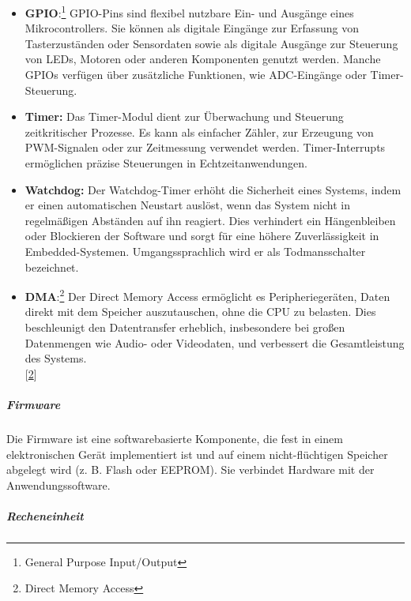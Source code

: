 \documentclass[
    headings=optiontotocandhead,%
    twoside,
    numbers=noenddot,%
    12pt, %
    titlepage, %
    parskip=full, %
    listof=leveldown, 
    numbers=noenddot, %
    a4paper,DIV=14,
    BCOR=15mm,
]{scrbook}
\begin{document}
\begin{itemize}
\item
  \textbf{GPIO}:\footnote{General Purpose Input/Output} GPIO-Pins sind
  flexibel nutzbare Ein- und Ausgänge eines Mikrocontrollers. Sie können
  als digitale Eingänge zur Erfassung von Tasterzuständen oder
  Sensordaten sowie als digitale Ausgänge zur Steuerung von LEDs,
  Motoren oder anderen Komponenten genutzt werden. Manche GPIOs verfügen
  über zusätzliche Funktionen, wie ADC-Eingänge oder Timer-Steuerung.
\item
  \textbf{Timer:} Das Timer-Modul dient zur Überwachung und Steuerung
  zeitkritischer Prozesse. Es kann als einfacher Zähler, zur Erzeugung
  von PWM-Signalen oder zur Zeitmessung verwendet werden.
  Timer-Interrupts ermöglichen präzise Steuerungen in
  Echtzeitanwendungen.
\item
  \textbf{Watchdog:} Der Watchdog-Timer erhöht die Sicherheit eines
  Systems, indem er einen automatischen Neustart auslöst, wenn das
  System nicht in regelmäßigen Abständen auf ihn reagiert. Dies
  verhindert ein Hängenbleiben oder Blockieren der Software und sorgt
  für eine höhere Zuverlässigkeit in Embedded-Systemen.
  Umgangssprachlich wird er als Todmansschalter bezeichnet.
\item
  \textbf{DMA}:\footnote{Direct Memory Access} Der Direct Memory Access
  ermöglicht es Peripheriegeräten, Daten direkt mit dem Speicher
  auszutauschen, ohne die CPU zu belasten. Dies beschleunigt den
  Datentransfer erheblich, insbesondere bei großen Datenmengen wie
  Audio- oder Videodaten, und verbessert die Gesamtleistung des
  Systems.\\
  {[}\protect\hyperlink{ref-EmbeddedSystems}{2}{]}
\end{itemize}

\hypertarget{firmware}{%
\subparagraph{Firmware}\label{firmware}}

Die Firmware ist eine softwarebasierte Komponente, die fest in einem
elektronischen Gerät implementiert ist und auf einem nicht-flüchtigen
Speicher abgelegt wird (z. B. Flash oder EEPROM). Sie verbindet Hardware
mit der Anwendungssoftware.

\hypertarget{recheneinheit}{%
\subparagraph{Recheneinheit}\label{recheneinheit}}
\end{document}
